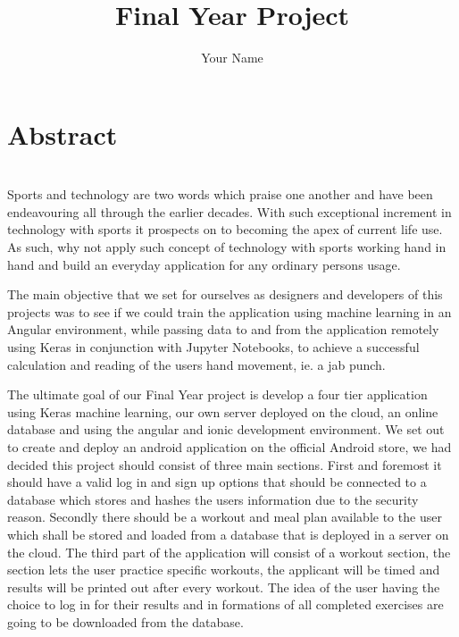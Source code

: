 \documentclass[a4paper,12pt,twoside]{report}
\begin{document}
\title{Final Year Project}
\author{Your Name}

\maketitle

\preface
\section*{Abstract}
\\
Sports and technology are two words which praise one another and have been endeavouring all through the earlier decades. With such exceptional increment in technology with sports it prospects on to becoming the apex of current life use. 
As such, why not apply such concept of technology with sports working hand in hand and build an everyday application for any ordinary persons usage.

The main objective that we set for ourselves as designers and developers of this projects was to see if we could train the application using machine learning in an Angular environment, while passing 
data to and from the application remotely using Keras in conjunction with Jupyter Notebooks, to achieve a successful calculation and reading of the users hand movement, ie. a jab punch.

The ultimate goal of our Final Year project is develop a four tier application using Keras machine learning, our own server deployed on the cloud, an online database and using the angular and ionic development environment.
We set out to create and deploy an android application on the official Android store, we had decided this project should consist of three main sections. 
First and foremost it should have a valid log in and sign up options that should be connected to a database which stores and hashes the users information due to the security reason. 
Secondly there should be a workout and meal plan available to the user which shall be stored and loaded from a database that is deployed in a server on the cloud.
The third part of the application will consist of a workout section, the section lets the user practice specific workouts, the applicant will be timed and results will be printed out after every workout. 
The idea of the user having the choice to log in for their results and in formations of all completed exercises are going to be downloaded from the database.
\newpage
\end{document}
